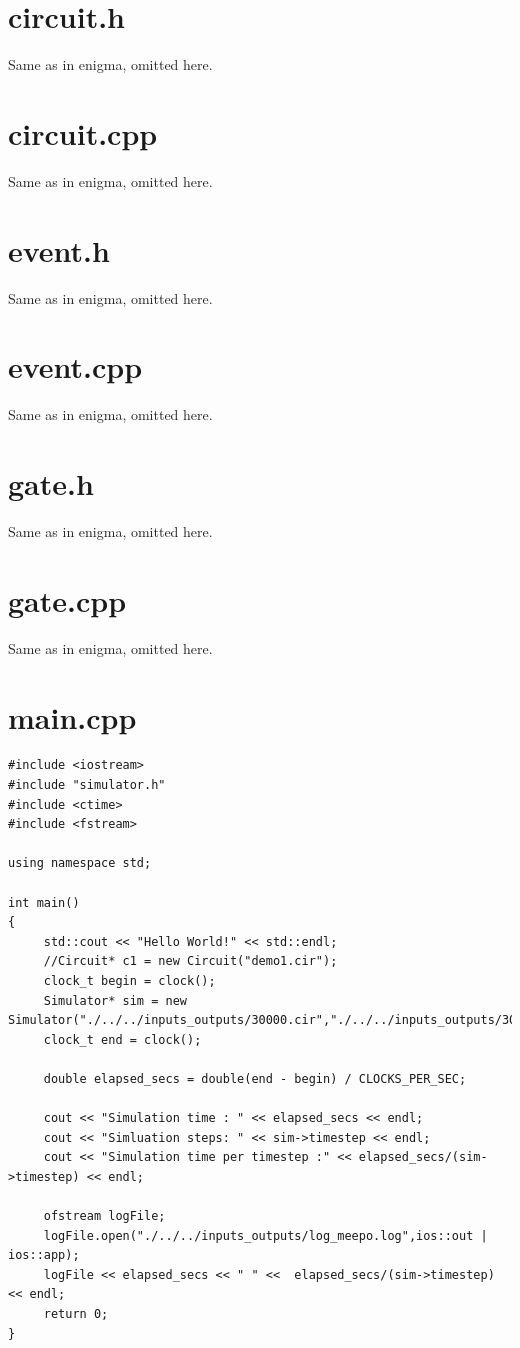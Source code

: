 \documentclass[a4paper,onesided,12pt]{report}
\begin{document}
\section{circuit.h}
Same as in enigma, omitted here. 
\section{circuit.cpp}
Same as in enigma, omitted here.
\section{event.h}
Same as in enigma, omitted here. 
\section{event.cpp}
Same as in enigma, omitted here.
\section{gate.h}
Same as in enigma, omitted here. 
\section{gate.cpp}
Same as in enigma, omitted here.
\section{main.cpp}
\begin{verbatim}
#include <iostream>
#include "simulator.h"
#include <ctime>
#include <fstream>

using namespace std;

int main()
{
	 std::cout << "Hello World!" << std::endl;
	 //Circuit* c1 = new Circuit("demo1.cir");
	 clock_t begin = clock();
	 Simulator* sim = new Simulator("./../../inputs_outputs/30000.cir","./../../inputs_outputs/30000.run","./../../inputs_outputs/30000_meepo.out");
	 clock_t end = clock();

	 double elapsed_secs = double(end - begin) / CLOCKS_PER_SEC;

	 cout << "Simulation time : " << elapsed_secs << endl;
	 cout << "Simluation steps: " << sim->timestep << endl;
	 cout << "Simulation time per timestep :" << elapsed_secs/(sim->timestep) << endl;

	 ofstream logFile;
	 logFile.open("./../../inputs_outputs/log_meepo.log",ios::out | ios::app);
	 logFile << elapsed_secs << " " <<  elapsed_secs/(sim->timestep) << endl;
	 return 0;
}
\end{verbatim}
\end{document}
